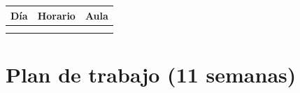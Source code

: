 \documentclass[12pt]{article}
\begin{document}
	\begin{center}
		\renewcommand{\arraystretch}{1.3}
		\begin{tabular}{|c|c|c|}
			\hline
			\textbf{Día} & \textbf{Horario} & \textbf{Aula} \\
			\hline
			\underline{\makebox[2.8cm][c]{Lunes}} &
			\underline{\makebox[2.8cm][c]{13--15}} &
			\underline{\makebox[2.8cm][c]{L-522}} \\
			\hline
			\underline{\makebox[2.8cm][c]{Miércoles}} &
			\underline{\makebox[2.8cm][c]{13--16}} &
			\underline{\makebox[2.8cm][c]{L-522}} \\
			\hline
		\end{tabular}
	\end{center}
	
	
	\vspace{1em}


\section*{Plan de trabajo (11 semanas)}
\end{document}
